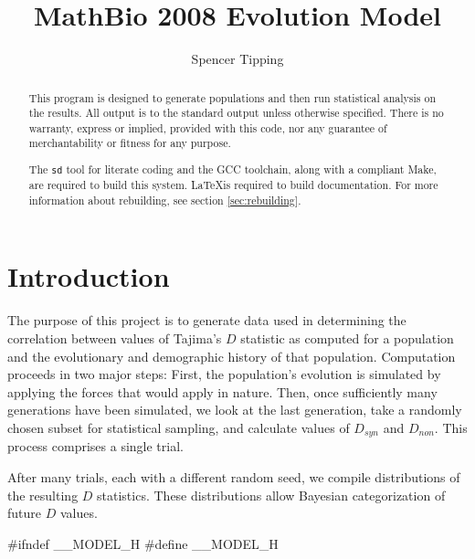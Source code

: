 \documentclass{article}
\begin{document}
  \title{MathBio 2008 Evolution Model}
  \author{Spencer Tipping}
  \maketitle

  \begin{abstract}
    
    This program is designed to generate populations and then run statistical
    analysis on the results. All output is to the standard output unless
    otherwise specified. There is no warranty, express or implied, provided with
    this code, nor any guarantee of merchantability or fitness for any purpose.

    The \verb|sd| tool for literate coding and the GCC toolchain, along with a
    compliant Make, are required to build this system. \LaTeX is required to
    build documentation. For more information about rebuilding, see section
    \ref{sec:rebuilding}.

  \end{abstract}

  \tableofcontents

  \def\D{$D$}
  \def\Ds{$D_{syn}$}
  \def\Dn{$D_{non}$}

  \section{Introduction}
    \label{sec:introduction}

    The purpose of this project is to generate data used in determining the
    correlation between values of Tajima's \D{} statistic as computed for a
    population and the evolutionary and demographic history of that population.
    Computation proceeds in two major steps: First, the population's evolution
    is simulated by applying the forces that would apply in nature. Then, once
    sufficiently many generations have been simulated, we look at the last
    generation, take a randomly chosen subset for statistical sampling, and
    calculate values of \Ds{} and \Dn. This process comprises a single trial.

    After many trials, each with a different random seed, we compile
    distributions of the resulting \D{} statistics. These distributions allow
    Bayesian categorization of future \D{} values.

\begin{ccode}
#ifndef __MODEL_H
#define __MODEL_H
\end{ccode}
\end{document}
